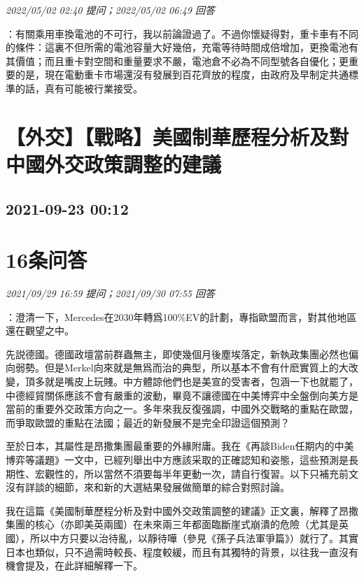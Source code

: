 \documentclass[twocolumn]{ctexart}
\begin{document}
\textit{\hfill\noindent\small 2022/05/02 02:40 提问；2022/05/02 06:49 回答}

：有關乘用車換電池的不可行，我以前論證過了。不過你懷疑得對，重卡車有不同的條件：這裏不但所需的電池容量大好幾倍，充電等待時間成倍增加，更換電池有其價值；而且重卡對空間和重量要求不嚴，電池倉不必為不同型號各自優化；更重要的是，現在電動重卡市場還沒有發展到百花齊放的程度，由政府及早制定共通標準的話，真有可能被行業接受。
\\


\section{【外交】【戰略】美國制華歷程分析及對中國外交政策調整的建議}
\subsection{2021-09-23 00:12}


\section{16条问答}

\textit{\hfill\noindent\small 2021/09/29 16:59 提问；2021/09/30 07:55 回答}

：澄清一下，Mercedes在2030年轉爲100\%EV的計劃，專指歐盟而言，對其他地區還在觀望之中。


先説德國。德國政壇當前群蟲無主，即使幾個月後塵埃落定，新執政集團必然也偏向弱勢。但是Merkel向來就是無爲而治的典型，所以基本不會有什麽實質上的大改變，頂多就是嘴皮上玩賤。中方體諒他們也是美宣的受害者，包涵一下也就罷了，中德經貿關係應該不會有嚴重的波動，畢竟不讓德國在中美博弈中全盤倒向美方是當前的重要外交政策方向之一。多年來我反復强調，中國外交戰略的重點在歐盟，而爭取歐盟的重點在法國；最近的新發展不是完全印證這個預測？

至於日本，其屬性是昂撒集團最重要的外緣附庸。我在《再談Biden任期内的中美博弈等議題》一文中，已經列舉出中方應該采取的正確認知和姿態，這些預測是長期性、宏觀性的，所以當然不須要每半年更動一次，請自行復習。以下只補充前文沒有詳談的細節，來和新的大選結果發展做簡單的綜合對照討論。

我在這篇《美國制華歷程分析及對中國外交政策調整的建議》正文裏，解釋了昂撒集團的核心（亦即美英兩國）在未來兩三年都面臨斷崖式崩潰的危險（尤其是英國），所以中方只要以治待亂，以靜待嘩（參見《孫子兵法軍爭篇》）就行了。其實日本也類似，只不過需時較長、程度較緩，而且有其獨特的背景，以往我一直沒有機會提及，在此詳細解釋一下。
\end{document}
